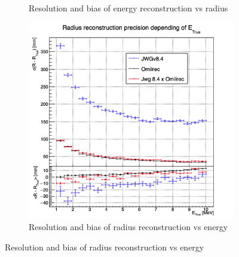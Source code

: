\documentclass[../main.tex]{subfiles}
\begin{document}
\begin{figure}[ht]
\begin{subfigure}[t]{0.32\linewidth}
    \caption{Resolution and bias of energy reconstruction vs radius}
    \label{fig:jgnn:MESBvRTC}
  \end{subfigure}
  \begin{subfigure}[t]{0.32\linewidth}
    \centering
    \includegraphics[width=\linewidth]{images/jgnn/MESBvET.png}
    \caption{Resolution and bias of radius reconstruction vs energy}
    \label{fig:jgnn:MSBvETC}
  \end{subfigure}



\end{figure}
\end{document}
